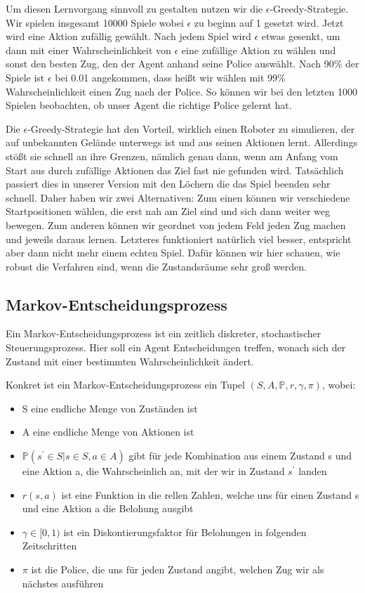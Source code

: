 Um diesen Lernvorgang sinnvoll zu gestalten nutzen wir die $\epsilon$-Greedy-Strategie. Wir spielen insgesamt 10000 Spiele wobei $\epsilon$ zu beginn auf 1 gesetzt wird. Jetzt wird eine Aktion zufällig gewählt. Nach jedem Spiel wird $\epsilon$ etwas gesenkt, um dann mit einer Wahrscheinlichkeit von $\epsilon$ eine zufällige Aktion zu wählen und sonst den besten Zug, den der Agent anhand seine Police auswählt. Nach 90\% der Spiele ist $\epsilon$ bei 0.01 angekommen, dass heißt wir wählen mit 99\% Wahrscheinlichkeit einen Zug nach der Police. So können wir bei den letzten 1000 Spielen beobachten, ob unser Agent die richtige Police gelernt hat.

Die $\epsilon$-Greedy-Strategie hat den Vorteil, wirklich einen Roboter zu simulieren, der auf unbekannten Gelände unterwegs ist und aus seinen Aktionen lernt. Allerdings stößt sie schnell an ihre Grenzen, nämlich genau dann, wenn am Anfang vom Start aus durch zufällige Aktionen das Ziel fast nie gefunden wird. Tatsächlich passiert dies in unserer Version mit den Löchern die das Spiel beenden sehr schnell. Daher haben wir zwei Alternativen: Zum einen können wir verschiedene Startpositionen wählen, die erst nah am Ziel sind und sich dann weiter weg bewegen. Zum anderen können wir geordnet von jedem Feld jeden Zug machen und jeweils daraus lernen. Letzteres funktioniert natürlich viel besser, entspricht aber dann nicht mehr einem echten Spiel. Dafür können wir hier schauen, wie robust die Verfahren sind, wenn die Zustandsräume sehr groß werden.

\subsection{Markov-Entscheidungsprozess}
\label{subsec:mdp}

Ein Markov-Entscheidungsprozess ist ein zeitlich diskreter, stochastischer Steuerungsprozess. Hier soll ein Agent Entscheidungen treffen, wonach sich der Zustand mit einer bestimmten Wahrscheinlichkeit ändert.

Konkret ist ein Markov-Entscheidungsprozess ein Tupel $(S, A, \mathbb{P}, r, \gamma, \pi)$, wobei:

\begin{itemize}
 \item S eine endliche Menge von Zuständen ist
 \item A eine endliche Menge von Aktionen ist
 \item $\mathbb{P}(s^{\prime} \in S | s \in S, a \in A)$ gibt für jede Kombination aus einem Zustand s und eine Aktion a, die Wahrscheinlich an, mit der wir in Zustand $s^{\prime}$ landen
 \item $r(s,a)$ ist eine Funktion in die rellen Zahlen, welche uns für einen Zustand s und eine Aktion a die Belohung ausgibt
 \item $\gamma \in [0,1)$ ist ein Diskontierungsfaktor für Belohungen in folgenden Zeitschritten
 \item $\pi$ ist die Police, die uns für jeden Zustand angibt, welchen Zug wir als nächstes ausführen
\end{itemize}

